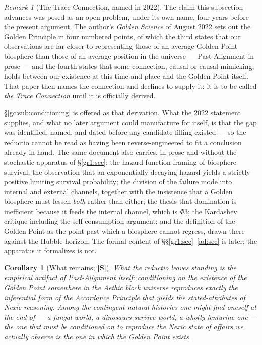 \documentclass[11pt]{article}
\numberwithin{equation}{section}
\theoremstyle{plain}
\newtheorem{corollary}[theorem]{Corollary}
\theoremstyle{definition}
\theoremstyle{remark}
\newtheorem{remark}[theorem]{Remark}
\begin{document}
\begin{remark}[The Trace Connection, named in 2022]
\label{gc:rem:trace}
The claim this subsection advances was posed as an open problem, under
its own name, four years before the present argument. The author's
\emph{Golden Science} of August 2022 \cite{GoldenScience22} sets out the
Golden Principle in four numbered points, of which the third states that
our observations are far closer to representing those of an average
Golden-Point biosphere than those of an average position in the universe
--- Past-Alignment in prose --- and the fourth states that some
connection, causal or causal-mimicking, holds between our existence at
this time and place and the Golden Point itself. That paper then names
the connection and declines to supply it: it is to be called \emph{the
Trace Connection} until it is officially derived.

\S\ref{gc:sub:conditioning} is offered as that derivation. What the 2022
statement supplies, and what no later argument could manufacture for
itself, is that the gap was identified, named, and dated before any
candidate filling existed --- so the reductio cannot be read as having
been reverse-engineered to fit a conclusion already in hand. The same
document also carries, in prose and without the stochastic apparatus of
\S\ref{gr1:sec}: the hazard-function framing of biosphere survival; the
observation that an exponentially decaying hazard yields a strictly
positive limiting survival probability; the division of the failure mode
into internal and external channels, together with the insistence that a
Golden biosphere must lessen \emph{both} rather than either; the thesis
that domination is inefficient because it feeds the internal channel,
which is $\Phi3$; the Kardashev critique including the
self-consumption argument; and the definition of the Golden Point as the
point past which a biosphere cannot regress, drawn there against the
Hubble horizon. The formal content of
\S\S\ref{gr1:sec}--\ref{ad:sec} is later; the apparatus it formalizes is
not.
\end{remark}

\begin{corollary}[What remains; \textbf{[S]}]\label{gc:cor:remains}
What the reductio leaves standing is the empirical artifact of
Past-Alignment itself: conditioning on the existence of the Golden Point
somewhere in the Aethic block universe reproduces exactly the
inferential form of the Accordance Principle that yields the
stated-attributes of Nexic reasoning. Among the contingent natural
histories one might find oneself at the end of --- a fungal world, a
dinosaurs-survive world, a wholly lemurine one --- the one that must be
conditioned on to reproduce the Nexic state of affairs we actually
observe is the one in which the Golden Point exists.
\end{corollary}
\end{document}
